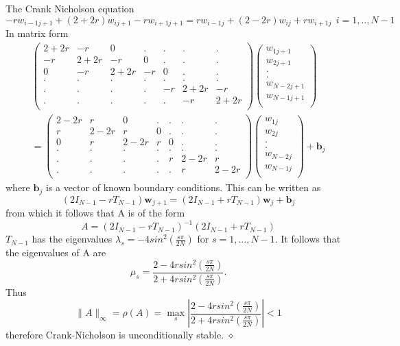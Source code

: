\begin{example} 
The Crank Nicholson equation
\[
 -rw_{i-1j+1}+(2+2r)w_{ij+1}-rw_{i+1j+1} 
 =rw_{i-1j}+(2-2r)w_{ij}+rw_{i+1j} 
\ \ i=1,..,N-1 \]
In matrix form
\begin{eqnarray*}
\left(\begin{array}{ccccccc}
2+2r&-r&0&.&.&.&.\\
-r&2+2r&-r&0&.&.&.\\
0&-r&2+2r&-r&0&.&.\\
.&.&.&.&.&.&.\\
.&.&.&.&-r&2+2r&-r\\
.&.&.&.&.&-r&2+2r\\
\end{array}\right)
\left(\begin{array}{c}
w_{1j+1}\\
w_{2j+1}\\
.\\
.\\
w_{N-2j+1}\\
w_{N-1j+1}\\
\end{array}\right)\\
=
\left(\begin{array}{ccccccc}
2-2r&r&0&.&.&.&.\\
r&2-2r&r&0&.&.&.\\
0&r&2-2r&r&0&.&.\\
.&.&.&.&.&.&.\\
.&.&.&.&r&2-2r&r\\
.&.&.&.&.&r&2-2r\\
\end{array}\right)
\left(\begin{array}{c}
w_{1j}\\
w_{2j}\\
.\\
.\\
w_{N-2j}\\
w_{N-1j}\\
\end{array}\right)
+\mathbf{b}_j
\end{eqnarray*}
where $\mathbf{b}_j$ is a vector of known boundary conditions. This can be written as
\[(2I_{N-1}-rT_{N-1})\mathbf{w}_{j+1}=(2I_{N-1}+rT_{N-1})\mathbf{w}_{j}+\mathbf{b}_j
\]
from which it follows that A is of the form
\[ A=(2I_{N-1}-rT_{N-1})^{-1}(2I_{N-1}+rT_{N-1}) \]
$T_{N-1}$ has the eigenvalues $\lambda_s=-4sin^2(\frac{s\pi}{2N})$ for $s=1,...,N-1$.
It follows that the eigenvalues of A are 
\[\mu_s=\frac{2-4rsin^2(\frac{s\pi}{2N})}{2+4rsin^2(\frac{s\pi}{2N})}.\]
Thus
\[ \lVert A\rVert_{\infty}=\rho(A)=\max_s\left|\frac{2-4rsin^2(\frac{s\pi}{2N})}{2+4rsin^2(\frac{s\pi}{2N})}  \right| <1\]
therefore Crank-Nicholson is unconditionally stable.
$\diamond$
\end{example} 
